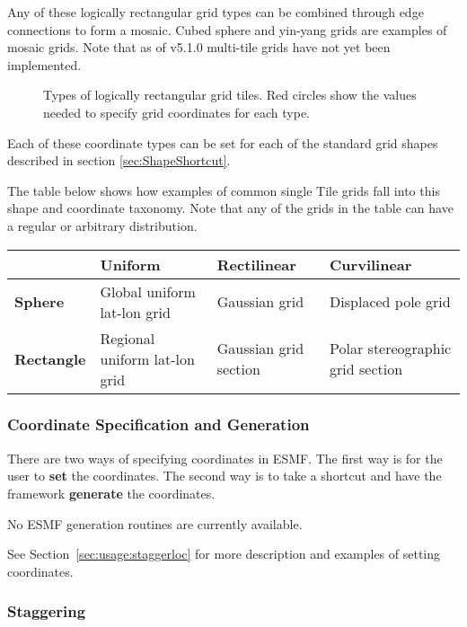 Any of these logically rectangular grid types can be combined through edge
connections to form a mosaic.  Cubed sphere and yin-yang grids are examples
of mosaic grids.  Note that as of v5.1.0 multi-tile grids have not yet been
implemented.
 
\begin{figure}
\caption{Types of logically rectangular grid tiles.  Red circles show the
values needed to specify grid coordinates for each type.}
\label{fig:LogRectGrids}
\end{figure}

Each of these coordinate types can be set for each of the standard grid shapes
described in section \ref{sec:ShapeShortcut}.  

The table below shows how examples of common single Tile grids fall 
into this shape and coordinate taxonomy.  Note that any
of the grids in the table can have a regular or arbitrary distribution.

\medskip
\begin{tabular}{|p{.8in}|p{1.6in}|p{1.6in}|p{1.6in}|}
\hline
 & {\bf Uniform} & {\bf Rectilinear} & {\bf Curvilinear} \\ 
\hline
{\bf Sphere} & Global uniform lat-lon grid & Gaussian grid & Displaced pole grid \\
\hline
{\bf Rectangle} & Regional uniform lat-lon grid & Gaussian grid section & Polar stereographic grid section\\
\hline
\end{tabular}

\subsubsection{Coordinate Specification and Generation}

There are two ways of specifying coordinates in ESMF.  The
first way is for the user to {\bf set} the coordinates.  The second 
way is to take a shortcut and have the framework {\bf generate}
the coordinates.  

No ESMF generation routines are currently available.

See Section~\ref{sec:usage:staggerloc} for more description and examples of
setting coordinates.

\subsubsection{Staggering}

